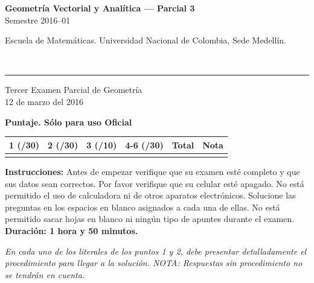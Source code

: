 \documentclass[11pt]{article}
\newcommand{\examheader}{%
  \noindent
  \begin{minipage}[t]{0.6\linewidth}
    {\small\bfseries Geometría Vectorial y Analítica --- Parcial 3}\\
    {\small Semestre 2016--01}
  \end{minipage}%
  \hfill
  \begin{minipage}[t]{0.35\linewidth}
    \raggedleft\small Escuela de Matemáticas. Universidad Nacional de Colombia, Sede Medellín.
  \end{minipage}\\[2pt]
  \rule{\linewidth}{0.6pt}
}
\newcommand{\nota}[1]{{\small\itshape\color{unalblue!70!black} #1}}
\begin{document}
\examheader

\begin{center}
{\large Tercer Examen Parcial de Geometría}\\[4pt]
{\small 12 de marzo del 2016}
\end{center}

\vspace{6pt}
\textbf{Puntaje. Sólo para uso Oficial}

\begin{center}
\begin{tabular}{|c|c|c|c|c|c|}
\hline
1 (/30) & 2 (/30) & 3 (/10) & 4-6 (/30) & Total & Nota \\
\hline
 & & & & & \\
\hline
\end{tabular}
\end{center}

\vspace{10pt}
\textbf{Instrucciones:} Antes de empezar verifique que su examen esté completo y que sus datos sean correctos. Por favor verifique que su celular esté apagado. No está permitido el uso de calculadora ni de otros aparatos electrónicos. Solucione las preguntas en los espacios en blanco asignados a cada una de ellas. No está permitido sacar hojas en blanco ni ningún tipo de apuntes durante el examen. \textbf{Duración: 1 hora y 50 minutos.}

\vspace{6pt}
\nota{En cada uno de los literales de los puntos 1 y 2, debe presentar detalladamente el procedimiento para llegar a la solución. NOTA: Respuestas sin procedimiento no se tendrán en cuenta.}
\end{document}
